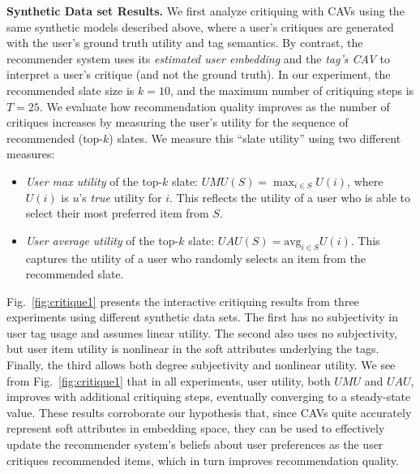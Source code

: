 \documentclass[manuscript,screen,nonacm]{acmart}
\newcommand{\1}{{\mathbf 1}}
\newcommand{\UAU}{\mathit{UAU}}
\newcommand{\UMU}{\mathit{UMU}}
\theoremstyle{TheoremNum}
\begin{document}
\vskip 2mm
\noindent
\textbf{Synthetic Data set Results.} \hspace*{2mm}
We first analyze critiquing with CAVs using the same synthetic models described above, where a user's critiques are generated with the user's ground truth utility and tag semantics. By contrast, the recommender system uses its \emph{estimated user embedding} and the \emph{tag's CAV} to interpret a user's critique (and not the ground truth). In our experiment, the recommended slate size is $k=10$, and the maximum number of critiquing steps is $T=25$. We evaluate how recommendation quality improves as the number of critiques increases by measuring the user's utility for the sequence of recommended (top-$k$) slates. We measure this ``slate utility'' using two different measures:
\begin{itemize}
\item \emph{User max utility} of the top-$k$ slate: $\UMU(S) = \max_{i\in S} U(i)$, where $U(i)$ is $u$'s \emph{true} utility for $i$. This reflects the utility of a user who is able to select their most preferred item from $S$.
\item \emph{User average utility} of the top-$k$ slate: $\UAU(S) = \mathrm{avg}_{i\in S} U(i)$. This captures the utility of a user who randomly selects an item from the recommended slate.
\end{itemize}

Fig.~\ref{fig:critique1} presents the interactive critiquing results from three experiments using different synthetic data sets. The first has no subjectivity in user tag usage and assumes linear utility. The second also uses no subjectivity, but user item utility is nonlinear in the soft attributes underlying the tags. Finally, the third allows both degree subjectivity and nonlinear utility. We see from Fig.~\ref{fig:critique1} that in all experiments, user utility, both $\UMU$ and $\UAU$, improves with additional critiquing steps, eventually converging to a steady-state value. These results corroborate our hypothesis that, since CAVs quite accurately represent soft attributes in embedding space, they can be used to effectively update the recommender system's beliefs about user preferences as the user critiques recommended items, which in turn improves recommendation quality.
% 
\end{document}
